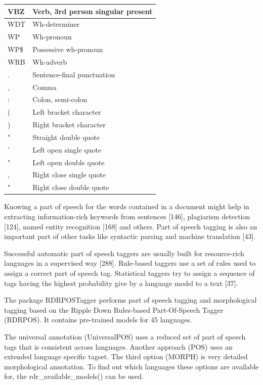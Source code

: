 \documentclass[10pt]{book}
\begin{document}
\begin{table}[h]
\begin{center}
\begin{tabular}{|l|l|}
\hline
VBZ & Verb, 3rd person singular present \\
\hline
WDT & Wh-determiner \\
\hline
WP & Wh-pronoun \\
\hline
WP\$ & Possessive wh-pronoun \\
\hline
WRB & Wh-adverb \\
\hline
. & Sentence-final punctuation \\
\hline
, & Comma \\
\hline
: & Colon, semi-colon \\
\hline
( & Left bracket character \\
\hline
) & Right bracket character \\
\hline
" & Straight double quote \\
\hline
' & Left open single quote \\
\hline
" & Left open double quote \\
\hline
, & Right close single quote \\
\hline
" & Right close double quote \\
\hline
\end{tabular}
\end{center}
\end{table}

Knowing a part of speech for the words contained in a document might help in extracting information-rich keywords from sentences [146], plagiarism detection [124], named entity recognition [168] and others. Part of speech tagging is also an important part of other tasks like syntactic parsing and machine translation [43].

Successful automatic part of speech taggers are usually built for resource-rich languages in a supervised way [288]. Rule-based taggers use a set of rules used to assign a correct part of speech tag. Statistical taggers try to assign a sequence of tags having the highest probability give by a language model to a text [37].

The package RDRPOSTagger performs part of speech tagging and morphological tagging based on the Ripple Down Rules-based Part-Of-Speech Tagger (RDRPOS). It contains pre-trained models for 45 languages.

The universal annotation (UniversalPOS) uses a reduced set of part of speech tags that is consistent across languages. Another approach (POS) uses an extended language specific tagset. The third option (MORPH) is very detailed morphological annotation. To find out which languages these options are available for, the rdr\_available\_models() can be used.
\end{document}
